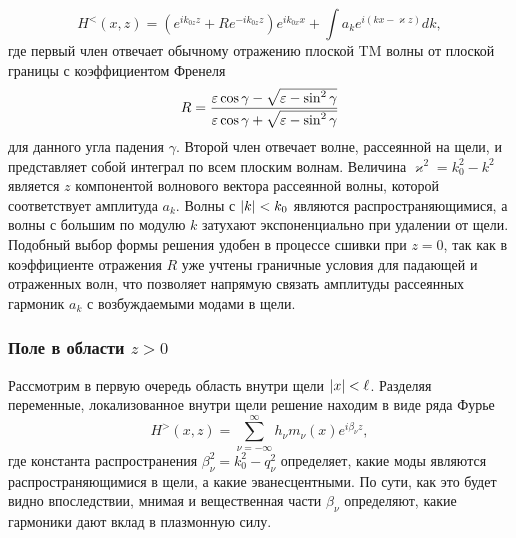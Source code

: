\begin{equation}
  H^<(x,z) = (e^{i k_{0z} z} + R e^{-i k_{0z} z}) e^{i k_{0x} x} + \int a_k e^{i (k x - \varkappa z)} dk, 
\end{equation}
где первый член отвечает обычному отражению плоской TM волны от плоской границы с коэффициентом Френеля 
\[
 R = \frac{\varepsilon \cos{\gamma} - \sqrt{\varepsilon - \sin^2{\gamma}}}{\varepsilon \cos{\gamma} + \sqrt{\varepsilon - \sin^2{\gamma}}}
\]
для данного угла падения $\gamma$.  
Второй член отвечает волне, рассеянной на щели, и представляет собой интеграл по всем плоским волнам. Величина $\varkappa^2 = k_0^2-k^2$ является
$z$ компонентой волнового вектора рассеянной волны, которой соответствует амплитуда $a_k$. Волны с $\lvert k\rvert < k_0$ являются распространяющимися,
а волны с большим по модулю $k$ затухают экспоненциально при удалении от щели. Подобный выбор формы решения удобен в процессе сшивки при $z = 0$, так как в коэффициенте отражения $R$ уже учтены граничные условия для падающей и отраженных волн, что позволяет напрямую связать амплитуды рассеянных гармоник $a_k$ с возбуждаемыми модами в щели. 

\subsubsection{Поле в области $z>0$}
Рассмотрим в первую очередь область внутри щели $\lvert x\rvert<\ell$. Разделяя переменные, локализованное внутри щели решение 
находим в виде ряда Фурье 
\begin{equation}
H^>(x,z) = \sum_{\nu = -\infty}^{\infty} h_\nu m_\nu(x) e^{i \beta_{\nu} z},
  \label{eq:Fourier_series}
\end{equation}
где константа распространения $\beta_\nu^2 =  k_0^2-q_\nu^2 $ определяет, какие моды являются распространяющимися в щели, а какие эванесцентными.
По сути, как это будет видно впоследствии, мнимая и вещественная части $\beta_\nu$ определяют, какие гармоники дают вклад в плазмонную силу. 

